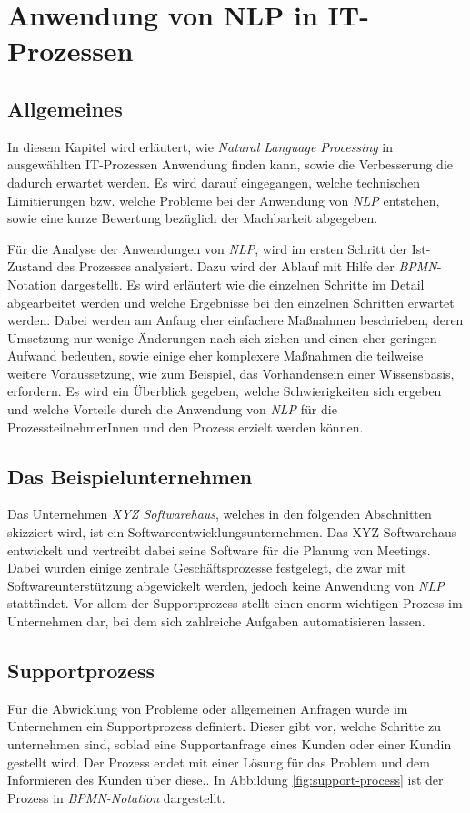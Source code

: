 \chapter{Anwendung von NLP in IT-Prozessen}
\label{cha:ApplicationsForNLPinProcesses}
\section{Allgemeines}

In diesem Kapitel wird erläutert, wie \textit{Natural Language Processing} in ausgewählten IT-Prozessen Anwendung finden kann, sowie die Verbesserung die dadurch erwartet werden. Es wird darauf eingegangen, welche technischen Limitierungen bzw. welche Probleme bei der Anwendung von \textit{NLP} entstehen, sowie eine kurze Bewertung bezüglich der Machbarkeit abgegeben.

Für die Analyse der Anwendungen von \textit{NLP}, wird im ersten Schritt der Ist-Zustand des Prozesses analysiert. Dazu wird der Ablauf mit Hilfe der \textit{BPMN}-Notation dargestellt. Es wird erläutert wie die einzelnen Schritte im Detail abgearbeitet werden und welche Ergebnisse bei den einzelnen Schritten erwartet werden. Dabei werden am Anfang eher einfachere Maßnahmen beschrieben, deren Umsetzung nur wenige Änderungen nach sich ziehen und einen eher geringen Aufwand bedeuten, sowie einige eher komplexere Maßnahmen die teilweise weitere Voraussetzung, wie zum Beispiel, das Vorhandensein einer Wissensbasis, erfordern. Es wird ein Überblick gegeben, welche Schwierigkeiten sich ergeben und welche Vorteile durch die Anwendung von \textit{NLP} für die ProzessteilnehmerInnen und den Prozess erzielt werden können.

\section{Das Beispielunternehmen}
Das Unternehmen \textit{XYZ Softwarehaus}, welches in den folgenden Abschnitten skizziert wird, ist ein Softwareentwicklungsunternehmen. Das XYZ Softwarehaus entwickelt und vertreibt dabei seine Software für die Planung von Meetings. Dabei wurden einige zentrale Geschäftsprozesse festgelegt, die zwar mit Softwareunterstützung abgewickelt werden, jedoch keine Anwendung von \textit{NLP} stattfindet. Vor allem der Supportprozess stellt einen enorm wichtigen Prozess im Unternehmen dar, bei dem sich zahlreiche Aufgaben automatisieren lassen. 

\section{Supportprozess}
Für die Abwicklung von Probleme oder allgemeinen Anfragen wurde im Unternehmen ein Supportprozess definiert. Dieser gibt vor, welche Schritte zu unternehmen sind, soblad eine Supportanfrage eines Kunden oder einer Kundin gestellt wird. Der Prozess endet mit einer Lösung für das Problem und dem Informieren des Kunden über diese.. In Abbildung \ref{fig:support-process} ist der Prozess in \textit{BPMN-Notation} dargestellt. 

